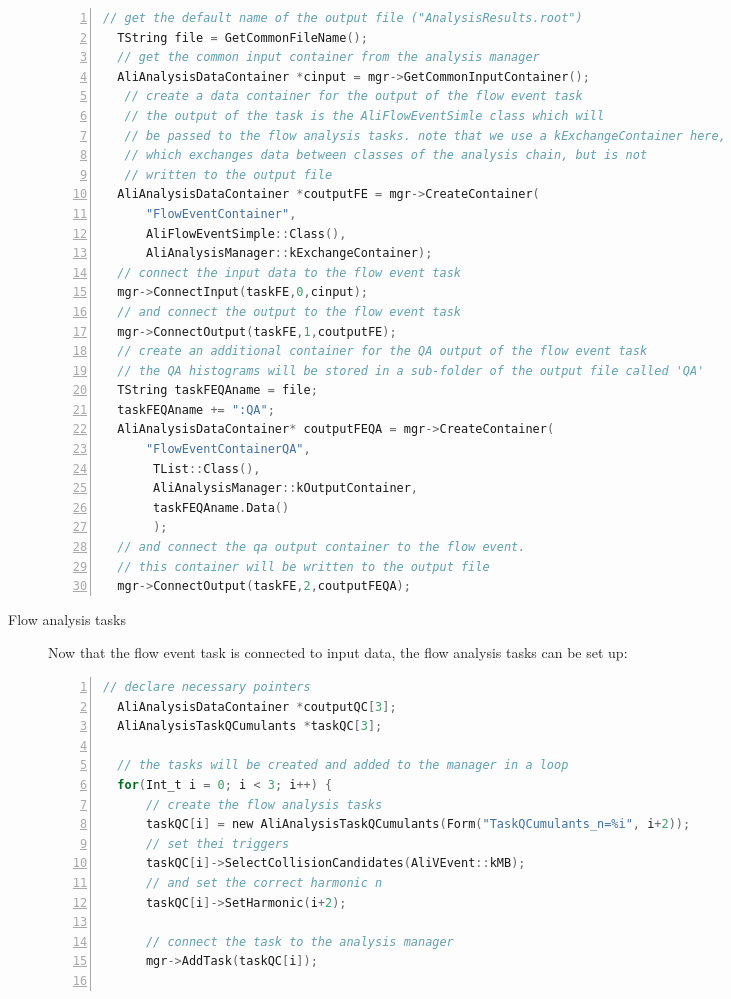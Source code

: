 \documentclass[a4paper]{book}
\numberwithin{equation}{subsection}
\begin{document}
\begin{description}
\begin{lstlisting}[language=C, numbers=left]
  // get the default name of the output file ("AnalysisResults.root")
  TString file = GetCommonFileName();
  // get the common input container from the analysis manager
  AliAnalysisDataContainer *cinput = mgr->GetCommonInputContainer();
   // create a data container for the output of the flow event task  
   // the output of the task is the AliFlowEventSimle class which will
   // be passed to the flow analysis tasks. note that we use a kExchangeContainer here,
   // which exchanges data between classes of the analysis chain, but is not
   // written to the output file
  AliAnalysisDataContainer *coutputFE = mgr->CreateContainer(
      "FlowEventContainer",
      AliFlowEventSimple::Class(),
      AliAnalysisManager::kExchangeContainer);
  // connect the input data to the flow event task
  mgr->ConnectInput(taskFE,0,cinput);
  // and connect the output to the flow event task
  mgr->ConnectOutput(taskFE,1,coutputFE);
  // create an additional container for the QA output of the flow event task
  // the QA histograms will be stored in a sub-folder of the output file called 'QA'
  TString taskFEQAname = file;
  taskFEQAname += ":QA";
  AliAnalysisDataContainer* coutputFEQA = mgr->CreateContainer(
      "FlowEventContainerQA",
       TList::Class(),
       AliAnalysisManager::kOutputContainer,
       taskFEQAname.Data()       
       );
  // and connect the qa output container to the flow event. 
  // this container will be written to the output file
  mgr->ConnectOutput(taskFE,2,coutputFEQA);\end{lstlisting}
  \item [Flow analysis tasks]
Now that the flow event task is connected to input data, the flow analysis tasks can be set up:
\begin{lstlisting}[language=C, numbers=left]
  // declare necessary pointers
  AliAnalysisDataContainer *coutputQC[3];
  AliAnalysisTaskQCumulants *taskQC[3];

  // the tasks will be created and added to the manager in a loop
  for(Int_t i = 0; i < 3; i++) {
      // create the flow analysis tasks
      taskQC[i] = new AliAnalysisTaskQCumulants(Form("TaskQCumulants_n=%i", i+2));
      // set thei triggers 
      taskQC[i]->SelectCollisionCandidates(AliVEvent::kMB);
      // and set the correct harmonic n
      taskQC[i]->SetHarmonic(i+2);

      // connect the task to the analysis manager
      mgr->AddTask(taskQC[i]);


\end{lstlisting}
\end{description}
\end{document}
